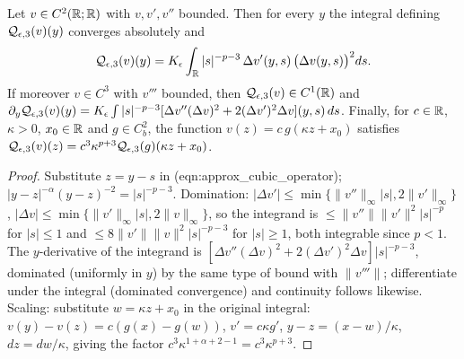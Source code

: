 \begin{lemma}
  \label{lem:c05_Q3_basic}
  Let $v\in C^2(\mathbb{R};\mathbb{R})$ with $v,v',v''$ bounded. Then for every $y$ the integral defining $\mathcal{Q}_{\epsilon,3}(v)(y)$ converges
  absolutely and
  \begin{equation}\label{eqn:approx_cubic_remainder_translated}
    \mathcal{Q}_{\epsilon,3}(v)(y)=K_\epsilon\int_{\mathbb{R}}|s|^{-p-3}\,\Delta v'(y,s)\,\bigl(\Delta v(y,s)\bigr)^2ds .
  \end{equation}
  If moreover $v\in C^3$ with $v'''$ bounded, then $\mathcal{Q}_{\epsilon,3}(v)\in C^1(\mathbb{R})$ and
  $\partial_y\mathcal{Q}_{\epsilon,3}(v)(y)=K_\epsilon\int|s|^{-p-3}[\Delta v''(\Delta v)^2+2(\Delta v')^2\Delta v](y,s)\,ds$.
  Finally, for $c\in\mathbb{R}$, $\kappa>0$, $x_0\in\mathbb{R}$ and $g\in C^2_b$, the function $v(z)=c\,g(\kappa z+x_0)$ satisfies
  $\mathcal{Q}_{\epsilon,3}(v)(z)=c^3\kappa^{p+3}\mathcal{Q}_{\epsilon,3}(g)(\kappa z+x_0)$.
\end{lemma}
\begin{proof}
  Substitute $z=y-s$ in (eqn:approx\_cubic\_operator); $|y-z|^{-\alpha}(y-z)^{-2}=|s|^{-p-3}$. Domination:
  $|\Delta v'|\le\min\{\|v''\|_\infty|s|,2\|v'\|_\infty\}$, $|\Delta v|\le\min\{\|v'\|_\infty|s|,2\|v\|_\infty\}$, so the integrand is
  $\le\|v''\|\|v'\|^2|s|^{-p}$ for $|s|\le1$ and $\le8\|v'\|\|v\|^2|s|^{-p-3}$ for $|s|\ge1$, both integrable since $p<1$.
  The $y$-derivative of the integrand is $[\Delta v''(\Delta v)^2+2(\Delta v')^2\Delta v]|s|^{-p-3}$, dominated (uniformly in $y$) by
  the same type of bound with $\|v'''\|$; differentiate under the integral (dominated convergence) and continuity follows likewise.
  Scaling: substitute $w=\kappa z+x_0$ in the original integral: $v(y)-v(z)=c(g(x)-g(w))$, $v'=c\kappa g'$, $y-z=(x-w)/\kappa$,
  $dz=dw/\kappa$, giving the factor $c^3\kappa^{1+\alpha+2-1}=c^3\kappa^{p+3}$.
\end{proof}

